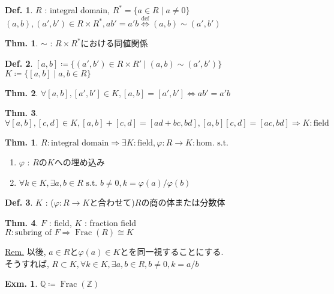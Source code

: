 \documentclass[uplatex,dvipdfmx,9pt]{beamer}
\newcommand{\defarrow}{\overset{\mathrm{def}}{\Leftrightarrow}}
\newcommand{\st}{\text{ s.t. }}
\newcommand{\Frac}[1]{\operatorname{Frac}(#1)}
\renewcommand{\hom}{\text{hom.}} %
\newcommand{\Z}{\mathbb{Z}}
\newcommand{\Q}{\mathbb{Q}}
\newcounter{textThmCount}
\theoremstyle{definition} %
\newtheorem{defn}{Def.}[subsection] %
\newtheorem{thm}{Thm.}[subsection] %
\newtheorem{thmText}[textThmCount]{Thm.}
\theoremstyle{example}
\newtheorem{exm}{Exm.}[subsection]
\begin{document}
    \begin{frame}

      \begin{defn}
        $R$ : integral domain, $R^* = \{ a \in R \mid a \neq 0\}$ \\
        $(a, b), (a', b') \in R \times R^*, ab' = a'b \defarrow (a, b) \sim (a', b')$
      \end{defn}

      \begin{thm}
        $\sim$ : $R \times R^*$における同値関係
      \end{thm}

      \begin{defn}
        $[a, b] \coloneqq \{(a', b') \in R \times R' \mid (a, b) \sim (a', b')\}$ \\
        $K \coloneqq \{[a, b] \mid a, b \in R\}$
      \end{defn}

      \begin{thm}
        $\forall [a, b], [a', b'] \in K, [a, b] = [a', b'] \Leftrightarrow ab' = a'b$
      \end{thm}

      \begin{thm}
        $\forall [a, b], [c, d] \in K, [a, b] + [c, d] = [ad + bc, bd], [a, b][c, d] = [ac, bd] \Rightarrow K : \text{field}$
      \end{thm}
      
    \end{frame}

    \begin{frame}

      \begin{thmText}
        $R : \text{integral domain} \Rightarrow \exists K : \text{field}, \varphi\colon R \to K : \hom \st$
        \begin{enumerate}
          \item $\varphi$ : $R$の$K$への埋め込み
          \item $\forall k \in K, \exists a, b \in R \st b \neq 0, k = \varphi(a) / \varphi(b)$
        \end{enumerate}
      \end{thmText}

      \begin{defn}
        $K$ : ($\varphi\colon R \to K$と合わせて)$R$の\alert{商の体}または\alert{分数体}
      \end{defn}

      \begin{thm}
        $F$ : field, $K$ : fraction field \\
        $R : \text{subring of $F$} \Rightarrow \Frac{R} \cong K$
      \end{thm}
      \underline{Rem.} 以後, $a \in R$と$\varphi(a) \in K$とを同一視することにする. \\
      そうすれば, $R \subset K, \forall k \in K, \exists a, b \in R, b \neq 0, k = a/b$

      \begin{exm}
        $\Q \coloneqq \Frac{\Z}$
      \end{exm}
      
    \end{frame}
\end{document}
